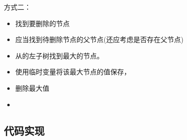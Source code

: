 \documentclass[a4paper]{report}
\begin{document}
方式二：
\begin{itemize}
  \item 找到要删除的节点
  \item 应当找到待删除节点的父节点(还应考虑是否存在父节点)
 \item 从的\textcolor[rgb]{1.00,0.00,0.00}{左子树}找到\textcolor[rgb]{1.00,0.00,0.00}{最大}的节点。
 \item 使用临时变量将该最大节点的值保存，
 \item 删除最大值
 \item {}
\end{itemize}

\subsection{代码实现}
\end{document}
